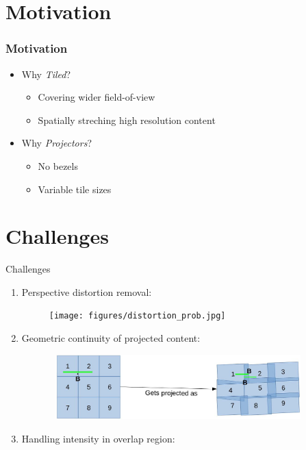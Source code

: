 \documentclass[40pt]{beamer}
\begin{document}
\section{Motivation}
\begin{frame}
\frametitle{Motivation}
\begin{itemize}
\item Why \textit{Tiled}?
\begin{itemize}
\item Covering wider field-of-view
\item  Spatially streching high resolution content\newline
\end{itemize}
\item Why \textit{Projectors}?
\begin{itemize}
\item No bezels
\item Variable tile sizes
\end{itemize}
\end{itemize}
\end{frame}

\section{Challenges}
\begin{frame}{Challenges}
\begin{enumerate}
\item Perspective distortion removal:
\begin{figure}
\texttt{[image: figures/distortion\_prob.jpg]}
\end{figure} 
\item Geometric continuity of projected content:
\begin{figure}
\includegraphics[width=10cm, height=2.5cm]{figures/continuity_prob.jpg}
\end{figure}
\item Handling intensity in overlap region:
\end{enumerate}
\end{frame}
\end{document}
